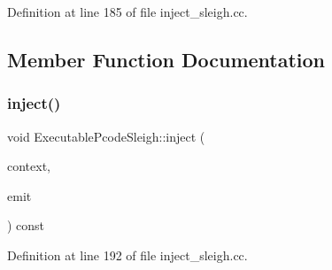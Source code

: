 Definition at line 185 of file inject\+\_\+sleigh.\+cc.



\subsection{Member Function Documentation}
\mbox{\label{class_executable_pcode_sleigh_a371bf279788a99380a3fb273e99a0266}} 
\subsubsection{\texorpdfstring{inject()}{inject()}}
{\footnotesize\ttfamily void Executable\+Pcode\+Sleigh\+::inject (\begin{DoxyParamCaption}\item[{\mbox{\hyperlink{class_inject_context}{Inject\+Context}} \&}]{context,  }\item[{\mbox{\hyperlink{class_pcode_emit}{Pcode\+Emit}} \&}]{emit }\end{DoxyParamCaption}) const\hspace{0.3cm}{\ttfamily [virtual]}}



Definition at line 192 of file inject\+\_\+sleigh.\+cc.

